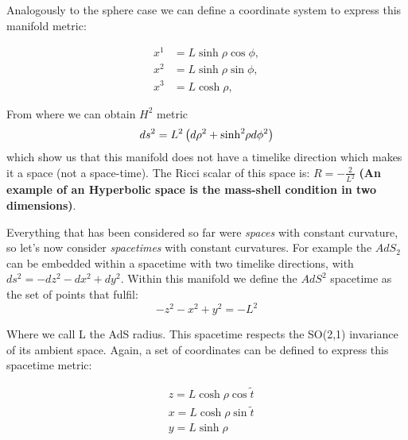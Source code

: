\documentclass[12pt]{article}
\begin{document}
\vspace{0.5cm}

Analogously to the sphere case we can define a coordinate system to express this manifold metric:

\begin{equation}
\begin{aligned}
    x^1 &= L \sinh{ \rho } \cos{ \phi }, \\
    x^2 &= L \sinh{ \rho } \sin{ \phi }, \\
    x^3 &= L \cosh{ \rho },
\end{aligned}
\end{equation}

From where we can obtain \( H^2 \) metric
\begin{equation}
    ds^2 = L^2 \left( d\rho^2 + \sinh^2{ \hspace{-2pt}\rho } d\phi^2 \right)
\end{equation}
which show us that this manifold does not have a timelike direction which makes it a space (not a space-time). The Ricci scalar of this space is: \( R = - \frac{2}{L^2} \) \textbf{(An example of an Hyperbolic space is the mass-shell condition in two dimensions)}.

\vspace{0.5cm}

Everything that has been considered so far were \textit{spaces} with constant curvature, so let's now consider \textit{spacetimes} with constant curvatures. For example the \( AdS_2 \) can be embedded within a spacetime with two timelike directions,  with \( ds^2 = -dz^2 - dx^2 + dy^2\). Within this manifold we define the \( AdS^2 \) spacetime as the set of points that fulfil:
\begin{equation}
    -z^2 - x^2 + y^2 = -L^2
\end{equation}

Where we call L the AdS radius. This spacetime respects the SO(2,1) invariance of its ambient space. Again, a set of coordinates can be defined to express this spacetime metric:

\begin{equation}
\begin{aligned}
    & z = L \cosh{ \rho } \cos{ \tilde{t} } \\
    & x = L \cosh{ \rho } \sin{ \tilde{t} } \\
    & y = L \sinh{ \rho }
\end{aligned}
\end{equation}
\end{document}
